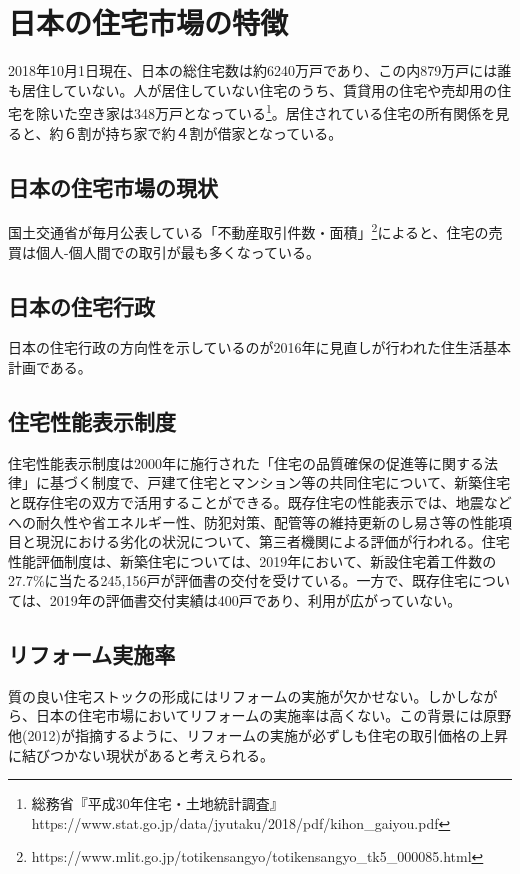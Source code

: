 \documentclass[a4paper,11pt]{jlreq}
\begin{document}
\section{日本の住宅市場の特徴}
2018年10月1日現在、日本の総住宅数は約6240万戸であり、この内879万戸には誰も居住していない。人が居住していない住宅のうち、賃貸用の住宅や売却用の住宅を除いた空き家は348万戸となっている\footnote{総務省『平成30年住宅・土地統計調査』https://www.stat.go.jp/data/jyutaku/2018/pdf/kihon\_gaiyou.pdf}。居住されている住宅の所有関係を見ると、約６割が持ち家で約４割が借家となっている。

\subsection{日本の住宅市場の現状}
国土交通省が毎月公表している「不動産取引件数・面積」\footnote{https://www.mlit.go.jp/totikensangyo/totikensangyo\_tk5\_000085.html}によると、住宅の売買は個人-個人間での取引が最も多くなっている。

\subsection{日本の住宅行政}
日本の住宅行政の方向性を示しているのが2016年に見直しが行われた住生活基本計画である。

\subsection{住宅性能表示制度}
住宅性能表示制度は2000年に施行された「住宅の品質確保の促進等に関する法律」に基づく制度で、戸建て住宅とマンション等の共同住宅について、新築住宅と既存住宅の双方で活用することができる。既存住宅の性能表示では、地震などへの耐久性や省エネルギー性、防犯対策、配管等の維持更新のし易さ等の性能項目と現況における劣化の状況について、第三者機関による評価が行われる。住宅性能評価制度は、新築住宅については、2019年において、新設住宅着工件数の27.7\%に当たる245,156戸が評価書の交付を受けている。一方で、既存住宅については、2019年の評価書交付実績は400戸であり、利用が広がっていない。


\subsection{リフォーム実施率}
質の良い住宅ストックの形成にはリフォームの実施が欠かせない。しかしながら、日本の住宅市場においてリフォームの実施率は高くない。この背景には原野他(2012)が指摘するように、リフォームの実施が必ずしも住宅の取引価格の上昇に結びつかない現状があると考えられる。
\end{document}
